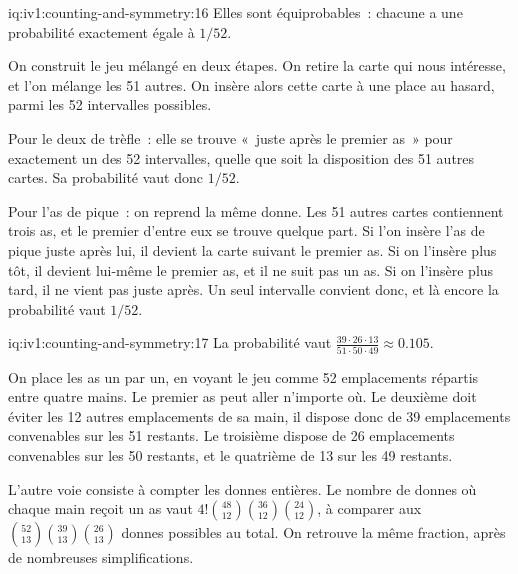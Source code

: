 \begin{solution}{iq:iv1:counting-and-symmetry:16}
Elles sont équiprobables~: chacune a une probabilité exactement égale à $1/52$.

On construit le jeu mélangé en deux étapes. On retire la carte qui nous intéresse, et l'on mélange les 51 autres. On insère alors cette carte à une place au hasard, parmi les 52 intervalles possibles.

Pour le deux de trèfle~: elle se trouve «~juste après le premier as~» pour exactement un des 52 intervalles, quelle que soit la disposition des 51 autres cartes. Sa probabilité vaut donc $1/52$.

Pour l'as de pique~: on reprend la même donne. Les 51 autres cartes contiennent trois as, et le premier d'entre eux se trouve quelque part. Si l'on insère l'as de pique juste après lui, il devient la carte suivant le premier as. Si on l'insère plus tôt, il devient lui-même le premier as, et il ne suit pas un as. Si on l'insère plus tard, il ne vient pas juste après. Un seul intervalle convient donc, et là encore la probabilité vaut $1/52$.

\end{solution}

\begin{solution}{iq:iv1:counting-and-symmetry:17}
La probabilité vaut $\frac{39 \cdot 26 \cdot 13}{51 \cdot 50 \cdot 49} \approx 0.105$.

On place les as un par un, en voyant le jeu comme 52 emplacements répartis entre quatre mains. Le premier as peut aller n'importe où. Le deuxième doit éviter les 12 autres emplacements de sa main, il dispose donc de 39 emplacements convenables sur les 51 restants. Le troisième dispose de 26 emplacements convenables sur les 50 restants, et le quatrième de 13 sur les 49 restants.

L'autre voie consiste à compter les donnes entières. Le nombre de donnes où chaque main reçoit un as vaut $4!\binom{48}{12}\binom{36}{12}\binom{24}{12}$, à comparer aux $\binom{52}{13}\binom{39}{13}\binom{26}{13}$ donnes possibles au total. On retrouve la même fraction, après de nombreuses simplifications.

\end{solution}

